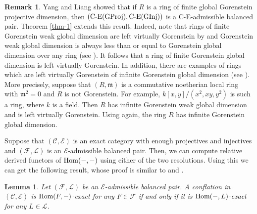\documentclass[reqno,12pt]{amsart}
\numberwithin{equation}{section}
\theoremstyle{plain}
\newtheorem{lemma}[theorem]{\bf Lemma}
\theoremstyle{definition}
\newtheorem{remark}[theorem]{\bf Remark}
\begin{document}
\begin{remark}\label{rmk-3}
    Yang and Liang \cite[Theorem 2.22]{YL14} showed that if $R$ is a ring of finite global
    Gorenstein projective dimension, then $(\text{C-E}({\rm GProj}),\text{C-E}({\rm GInj}))$
    is a C-E-admissible balanced pair. Theorem \ref{thm-1} extends this result. Indeed, note that rings
    of finite Gorenstein weak global dimension are left virtually Gorenstein by
    \cite[Theorem A]{DLW23} and Gorenstein weak global dimension is always less than or equal
    to Gorenstein global dimension over any ring (see \cite[Theorem 3.7]{WYSZ23}). It follows
    that a ring of finite Gorenstein global dimension is left virtually Gorenstein. In
    addition, there are examples of rings which are left virtually Gorenstein of infinite
    Gorenstein global dimension (see \cite[Example 2.15]{DLW23}). More precisely, suppose that
    $(R,\mathfrak{m})$ is a commutative noetherian local ring with $\mathfrak{m}^2=0$ and $R$
    is not Gorenstein. For example, $k[x,y]/(x^2,xy,y^2)$ is such a ring, where $k$ is a
    field. Then $R$ has infinite Gorenstein weak global dimension and is left virtually
    Gorenstein. Using \cite[Theorem 3.7]{WYSZ23} again, the ring $R$ has infinite Gorenstein
    global dimension.
\end{remark}

Suppose that $(\mathcal{C},\mathcal{E})$ is an exact category with enough projectives and
injectives and $(\mathcal{F},\mathcal{L})$ is an $\mathcal{E}$-admissible balanced pair. Then,
we can compute relative derived functors of $\mbox{\rm Hom}(-,-)$ using either of the two
resolutions. Using this we can get the following result, whose proof is similar to
\cite[Proposition 2.2]{C10} and \cite[Lemma 3.1]{EPZ20}.

\begin{lemma}\label{lem-1}
    Let $(\mathcal{F},\mathcal{L})$ be an $\mathcal{E}$-admissible balanced pair. A conflation in $(\mathcal{C},\mathcal{E})$ is $\mbox{\rm Hom}(F,-)$-exact for any $F\in\mathcal{F}$ if and only if it is $\mbox{\rm Hom}(-,L)$-exact for any $L\in\mathcal{L}$.
\end{lemma}
\end{document}
